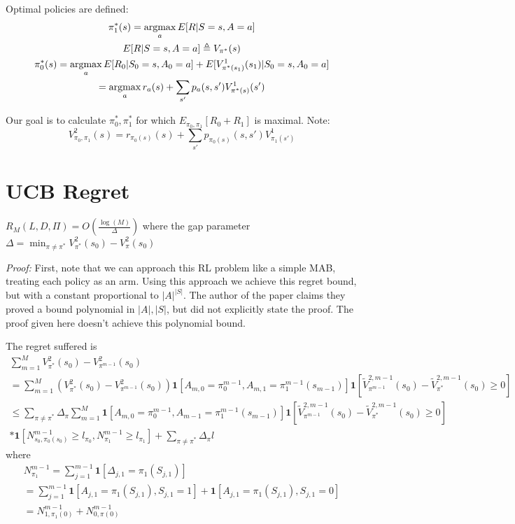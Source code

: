 \documentclass[11pt]{article}
\begin{document}
Optimal policies are defined:
\begin{gather*}
\pi_1^*(s) = \operatorname*{argmax}_a E[R|S=s, A=a] \\
E[R|S=s, A=a] \triangleq V_{\pi^*}(s) \\
\pi_0^*(s) = \operatorname*{argmax}_a E[R_0|S_0=s, A_0=a] +E[V^{1}_{\pi^*(s_1)}(s_1) | S_0 = s, A_0 = a]\\
= \operatorname*{argmax}_a r_a(s) + \sum_{s'}p_a(s, s') V^{1}_{\pi^*(s)}(s')
\end{gather*}

Our goal is to calculate $\pi_0^*, \pi_1^*$ for which $E_{\pi_0, \pi_1}[R_0+R_1]$ is maximal. Note:
$$V_{\pi_0, \pi_1}^2(s) = r_{\pi_0(s)}(s) + \sum_{s'}p_{\pi_0(s)}(s, s') V^1_{\pi_1(s')}$$

\section{UCB Regret}

\begin{theorem}
	$R_M(L,D,\Pi) = O(\frac{\log(M)}{\Delta})$ where the gap parameter $\Delta = \min_{\pi \ne \pi^*} V^2_{\pi^*}(s_0) - V^2_{\pi}(s_0)$
\end{theorem}
\textit{Proof:} First, note that we can approach this RL problem like a simple MAB, treating each policy as an arm. Using this approach we achieve this regret bound, but with a constant proportional to $|A|^{|S|}$. The author of the paper claims they proved a bound polynomial in $|A|, |S|$, but did not explicitly state the proof. The proof given here doesn't achieve this polynomial bound.

The regret suffered is
\begin{gather*}
\sum_{m=1}^{M} V^2_{\pi^*}(s_0) - V^2_{\pi^{m-1}}(s_0) \\
= \sum_{m=1}^{M} (V^2_{\pi^*}(s_0) - V^2_{\pi^{m-1}}(s_0)) \mathbf{1}[A_{m,0} = \pi_0^{m-1}, A_{m,1} = \pi_1^{m-1}(s_{m-1})]\mathbf{1}[\tilde{V}^{2, m-1}_{\pi^{m-1}}(s_0)-\tilde{V}^{2, m-1}_{\pi^{*}}(s_0) \ge 0] \\
\le \sum_{\pi \ne \pi^*} \Delta_\pi \sum_{m=1}^{M} \mathbf{1}[A_{m,0} = \pi_0^{m-1}, A_{m-1} = \pi_1^{m-1}(s_{m-1})]\mathbf{1}[\tilde{V}^{2, m-1}_{\pi^{m-1}}(s_0)-\tilde{V}^{2, m-1}_{\pi^{*}}(s_0) \ge 0] \\
* \mathbf{1}[N^{m-1}_{s_0, \pi_0(s_0)} \ge l_{\pi_0}, N^{m-1}_{\pi_1} \ge l_{\pi_1}] + \sum_{\pi \ne \pi^*} \Delta_\pi l
\end{gather*}
where 
\begin{gather*}
N_{\pi_1}^{m-1} = \sum_{j=1}^{m-1} \mathbf{1}[\Delta_{j, 1} = \pi_1(S_{j,1})] \\
= \sum_{j=1}^{m-1} \mathbf{1}[A_{j,1} = \pi_1(S_{j,1}), S_{j,1} = 1] + \mathbf{1}[A_{j,1} = \pi_1(S_{j,1}), S_{j,1} = 0] \\
= N_{1, \pi_1(0)}^{m-1} + N_{0, \pi(0)}^{m-1}
\end{gather*}
\end{document}
